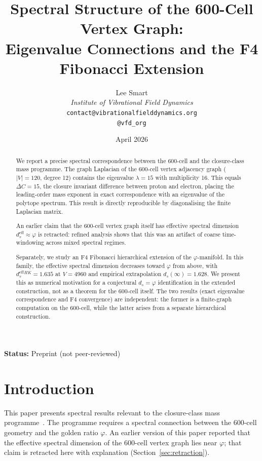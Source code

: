 \documentclass[12pt]{article}
\title{Spectral Structure of the 600-Cell Vertex Graph:\\Eigenvalue Connections and the F4 Fibonacci Extension}
\author{%
  Lee Smart\\[4pt]
  \textit{Institute of Vibrational Field Dynamics}\\[2pt]
  \texttt{contact@vibrationalfielddynamics.org}\\[2pt]
  \texttt{@vfd\_org}%
}
\date{April 2026}
\newcommand{\phig}{\varphi}
\newcommand{\ds}{d_s}
\newcommand{\dseff}{d_s^{\mathrm{eff}}}
\begin{document}
\maketitle

\noindent\textbf{Status:} Preprint (not peer-reviewed)

\begin{abstract}
We report a precise spectral correspondence between the 600-cell and the closure-class mass programme. The graph Laplacian of the 600-cell vertex adjacency graph ($|V| = 120$, degree 12) contains the eigenvalue $\lambda = 15$ with multiplicity 16. This equals $\Delta C = 15$, the closure invariant difference between proton and electron, placing the leading-order mass exponent in exact correspondence with an eigenvalue of the polytope spectrum. This result is directly reproducible by diagonalising the finite Laplacian matrix.

An earlier claim that the 600-cell vertex graph itself has effective spectral dimension $\dseff \approx \phig$ is retracted: refined analysis shows that this was an artifact of coarse time-windowing across mixed spectral regimes.

Separately, we study an F4 Fibonacci hierarchical extension of the $\phig$-manifold. In this family, the effective spectral dimension decreases toward $\phig$ from above, with $\dseff^{HK} = 1.635$ at $V = 4960$ and empirical extrapolation $\ds(\infty) = 1.628$. We present this as numerical motivation for a conjectural $\ds = \phig$ identification in the extended construction, not as a theorem for the 600-cell itself. The two results (exact eigenvalue correspondence and F4 convergence) are independent: the former is a finite-graph computation on the 600-cell, while the latter arises from a separate hierarchical construction.
\end{abstract}

\section{Introduction}\label{sec:intro}

This paper presents spectral results relevant to the closure-class mass programme~\citep{SmartI, SmartII}. The programme requires a spectral connection between the 600-cell geometry and the golden ratio $\phig$. An earlier version of this paper reported that the effective spectral dimension of the 600-cell vertex graph lies near $\phig$; that claim is retracted here with explanation (Section~\ref{sec:retraction}).
\end{document}
